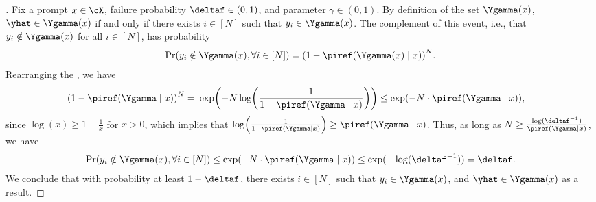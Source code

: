 \begin{proof}[]
    Fix a prompt $x \in \cX$, failure probability $\deltaf \in (0, 1)$,
    and parameter $\gamma\in(0,1)$.
    By definition of the set $\Ygamma(x)$, $\yhat \in \Ygamma(x)$ if
    and only if there exists $i \in [N]$ such that $y_i\in\Ygamma(x)$. The complement of this event, i.e., that $y_i \notin \Ygamma(x)$ for all $i \in [N]$, has probability 
    \begin{align}
        \Pr\prn*{y_i \notin \Ygamma(x),{}\forall i \in [N]} = \prn*{1 - \piref(\Ygamma(x)\mid{}x)}^N.
    \end{align}
    Rearranging the \rhs, we have 
    \begin{align}
        \prn*{1 - \piref(\Ygamma\mid{}x)}^N 
        =&~ 
        \exp\prn*{-N\log\prn*{\frac{1}{1-\piref(\Ygamma\mid{}x)}}}
        \le
        \exp\prn*{-N\cdot\piref(\Ygamma\mid{}x)},
    \end{align}
    since $\log(x) \ge 1-\frac{1}{x}$ for $x > 0$, which implies that $\log\prn*{\frac{1}{1-\piref(\Ygamma\mid{}x)}} \ge \piref(\Ygamma\mid{}x)$. 
    Thus, as long as $N \ge
    \frac{\log(\deltaf^{-1})}{\piref(\Ygamma\mid{}x)}$, we have
    \begin{align}
        \Pr\prn*{y_i \notin \Ygamma(x),{}\forall i \in [N]} 
        \le 
        \exp\prn*{-N\cdot\piref(\Ygamma\mid{}x)}
        \le 
        \exp(-\log(\deltaf^{-1})) = \deltaf. 
    \end{align}
    We conclude that with probability at least $1-\deltaf$, there exists $i \in [N]$ such that $y_i \in \Ygamma(x)$, and $\yhat \in \Ygamma(x)$ as a result.  

\end{proof}


